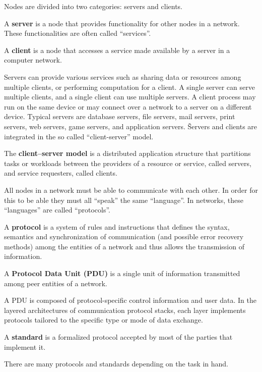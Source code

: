 Nodes are divided into two categories: servers and clients.

\bd[Server]
A \textbf{server} is a node that provides functionality for other nodes in a network. These functionalities are often
called ``services''.
\ed

\bd[Client]
A \textbf{client} is a node that accesses a service made available by a server in a computer network.
\ed

Servers can provide various services such as sharing data or resources among multiple clients, or performing
computation for a client. A single server can serve multiple clients, and a single client can use multiple servers. A
client process may run on the same device or may connect over a network to a server on a different device. Typical
servers are database servers, file servers, mail servers, print servers, web servers, game servers, and application
servers. \v

Servers and clients are integrated in the so called ``client-server'' model.

The \textbf{client–server model} is a distributed application structure that partitions tasks or workloads between
the providers of a resource or service, called servers, and service requesters, called clients.
\ed

All nodes in a network must be able to communicate with each other. In order for this to be able they must all
``speak'' the same ``language''. In networks, these ``languages'' are called ``protocols''.

\bd[Protocol]
A \textbf{protocol} is a system of rules and instructions that defines the syntax, semantics and synchronization of
communication (and possible error recovery methods) among the entities of a network and thus allows the transmission
of information.
\ed

A \textbf{Protocol Data Unit (PDU)} is a single unit of information transmitted among peer entities of a network.
\ed

A PDU is composed of protocol-specific control information and user data. In the layered architectures of
communication protocol stacks, each layer implements protocols tailored to the specific type or mode of data exchange.

\bd[Standard]
A \textbf{standard} is a formalized protocol accepted by most of the parties that implement it.
\ed

There are many protocols and standards depending on the task in hand.

